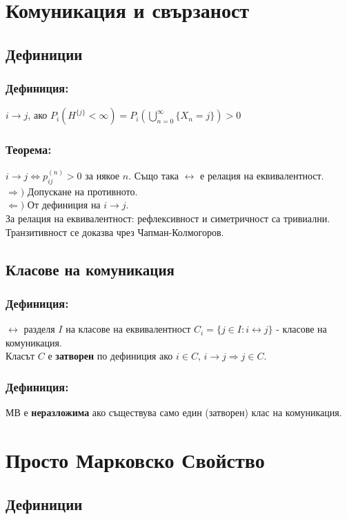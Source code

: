 \documentclass{article}
\begin{document}
\section{Комуникация и свързаност}
\subsection{Дефиниции}
\subsubsection*{Дефиниция:}
$i \to j$, ако $P_i(H^{\{j\}} < \infty) = P_i\left(\bigcup_{n=0}^\infty \{X_n = j\}\right) > 0$

\subsubsection*{Теорема:}
$i \to j \Leftrightarrow p_{ij}^{(n)} > 0$ за някое $n$. Също така $\leftrightarrow$ е релация на еквивалентност. \\
$\Rightarrow)$ Допускане на противното. \\
$\Leftarrow)$ От дефиниция на $i \to j$. \\
За релация на еквивалентност: рефлексивност и симетричност са тривиални. Транзитивност се доказва чрез Чапман-Колмогоров.

\subsection{Класове на комуникация}
\subsubsection*{Дефиниция:}
$\leftrightarrow$ разделя $I$ на класове на еквивалентност $C_i = \{j \in I : i \leftrightarrow j\}$ - класове на комуникация. \\
Класът $C$ е \textbf{затворен} по дефиниция ако $i \in C$, $i \to j \Rightarrow j \in C$.

\subsubsection*{Дефиниция:}
МВ е \textbf{неразложима} ако съществува само един (затворен) клас на комуникация.

\section{Просто Марковско Свойство}
\subsection{Дефиниции}
\end{document}
